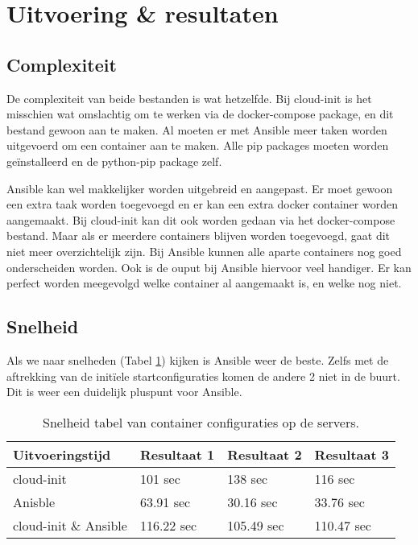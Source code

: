 \section{Uitvoering \& resultaten}
\subsection{Complexiteit}
De complexiteit van beide bestanden is wat hetzelfde. Bij cloud-init is het misschien wat omslachtig om te werken via de docker-compose package, en dit bestand gewoon aan te maken. Al moeten er met Ansible meer taken worden uitgevoerd om een container aan te maken. Alle pip packages moeten worden geïnstalleerd en de python-pip package zelf. 

Ansible kan wel makkelijker worden uitgebreid en aangepast. Er moet gewoon een extra taak worden toegevoegd en er kan een extra docker container worden aangemaakt. Bij cloud-init kan dit ook worden gedaan via het docker-compose bestand. Maar als er meerdere containers blijven worden toegevoegd, gaat dit niet meer overzichtelijk zijn. Bij Ansible kunnen alle aparte containers nog goed onderscheiden worden. Ook is de ouput bij Ansible hiervoor veel handiger. Er kan perfect worden meegevolgd welke container al aangemaakt is, en welke nog niet.

\subsection{Snelheid}
Als we naar snelheden (Tabel \ref{tab:tabel resultaten container}) kijken is Ansible  weer de beste. Zelfs met de aftrekking van de initïele startconfiguraties komen de andere 2 niet in de buurt. Dit is weer een duidelijk pluspunt voor Ansible.
\begin{table}[!htb]
	\centering
	\begin{tabular}{| l | l | l |l |}
        \hline
        \textbf{Uitvoeringstijd} & Resultaat 1 & Resultaat 2 & Resultaat 3   \\ \hline
        cloud-init & 101 sec & 138 sec & 116 sec  \\ \hline
        Anisble & 63.91 sec & 30.16 sec & 33.76 sec \\ \hline
        cloud-init \& Ansible & 116.22 sec & 105.49 sec & 110.47 sec \\
        \hline
    \end{tabular}
	\caption{Snelheid tabel van container configuraties op de servers.}
	\label{tab:tabel resultaten container}
\end{table}

